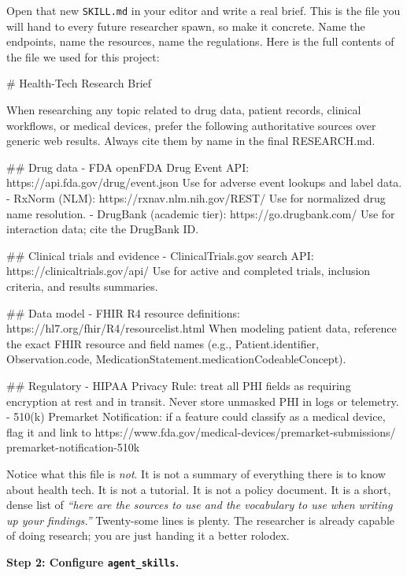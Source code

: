 \documentclass[11pt,letterpaper,openany]{book}
\begin{document}
\begin{gsdscenario}
Open that new \texttt{SKILL.md} in your editor and write a real brief.
This is the file you will hand to every future researcher spawn, so
make it concrete. Name the endpoints, name the resources, name the
regulations. Here is the full contents of the file we used for this
project:

\begin{gsdplain}
# Health-Tech Research Brief

When researching any topic related to drug data, patient records,
clinical workflows, or medical devices, prefer the following
authoritative sources over generic web results. Always cite them
by name in the final RESEARCH.md.

## Drug data
- FDA openFDA Drug Event API:
  https://api.fda.gov/drug/event.json
  Use for adverse event lookups and label data.
- RxNorm (NLM):
  https://rxnav.nlm.nih.gov/REST/
  Use for normalized drug name resolution.
- DrugBank (academic tier):
  https://go.drugbank.com/
  Use for interaction data; cite the DrugBank ID.

## Clinical trials and evidence
- ClinicalTrials.gov search API:
  https://clinicaltrials.gov/api/
  Use for active and completed trials, inclusion criteria,
  and results summaries.

## Data model
- FHIR R4 resource definitions:
  https://hl7.org/fhir/R4/resourcelist.html
  When modeling patient data, reference the exact FHIR resource
  and field names (e.g., Patient.identifier, Observation.code,
  MedicationStatement.medicationCodeableConcept).

## Regulatory
- HIPAA Privacy Rule: treat all PHI fields as requiring encryption
  at rest and in transit. Never store unmasked PHI in logs or
  telemetry.
- 510(k) Premarket Notification: if a feature could classify as
  a medical device, flag it and link to
  https://www.fda.gov/medical-devices/premarket-submissions/
  premarket-notification-510k
\end{gsdplain}

Notice what this file is \emph{not}. It is not a summary of everything
there is to know about health tech. It is not a tutorial. It is not a
policy document. It is a short, dense list of \textit{``here are the
sources to use and the vocabulary to use when writing up your
findings.''} Twenty-some lines is plenty. The researcher is already
capable of doing research; you are just handing it a better rolodex.

\textbf{\large Step 2: Configure \texttt{agent\_skills}.}


\end{gsdscenario}
\end{document}
